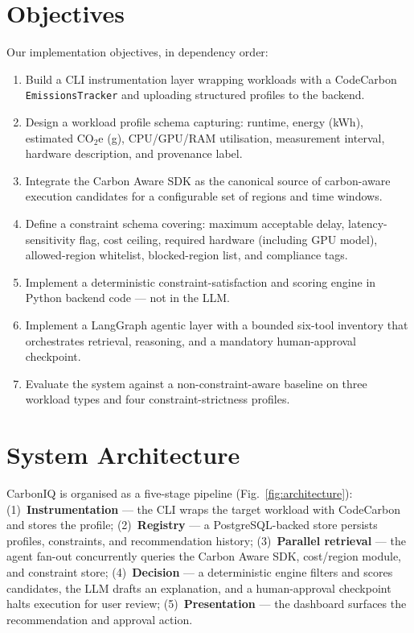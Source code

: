 ﻿\documentclass[conference]{IEEEtran}
\begin{document}
\section{Objectives}

Our implementation objectives, in dependency order:
\begin{enumerate}
\item Build a CLI instrumentation layer wrapping workloads with a CodeCarbon
\texttt{EmissionsTracker} and uploading structured profiles to the backend.
\item Design a workload profile schema capturing: runtime, energy (kWh),
estimated CO$_2$e (g), CPU/GPU/RAM utilisation, measurement interval,
hardware description, and provenance label.
\item Integrate the Carbon Aware SDK as the canonical source of carbon-aware
execution candidates for a configurable set of regions and time windows.
\item Define a constraint schema covering: maximum acceptable delay,
latency-sensitivity flag, cost ceiling, required hardware (including GPU model),
allowed-region whitelist, blocked-region list, and compliance tags.
\item Implement a deterministic constraint-satisfaction and scoring engine in Python
backend code --- not in the LLM.
\item Implement a LangGraph agentic layer with a bounded six-tool inventory that
orchestrates retrieval, reasoning, and a mandatory human-approval checkpoint.
\item Evaluate the system against a non-constraint-aware baseline on three workload
types and four constraint-strictness profiles.
\end{enumerate}

\section{System Architecture}

CarbonIQ is organised as a five-stage pipeline (Fig.~\ref{fig:architecture}):
(1)~\textbf{Instrumentation} --- the CLI wraps the target workload with CodeCarbon
and stores the profile;
(2)~\textbf{Registry} --- a PostgreSQL-backed store persists profiles, constraints,
and recommendation history;
(3)~\textbf{Parallel retrieval} --- the agent fan-out concurrently queries the
Carbon Aware SDK, cost/region module, and constraint store;
(4)~\textbf{Decision} --- a deterministic engine filters and scores candidates,
the LLM drafts an explanation, and a human-approval checkpoint halts execution
for user review;
(5)~\textbf{Presentation} --- the dashboard surfaces the recommendation and
approval action.
\end{document}
